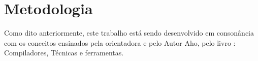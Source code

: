 \chapter{Metodologia}

Como dito anteriormente, este trabalho está sendo desenvolvido em consonância com os conceitos ensinados pela orientadora e pelo Autor Aho, pelo livro : Compiladores, Técnicas e ferramentas.
\vspace{.3cm}


